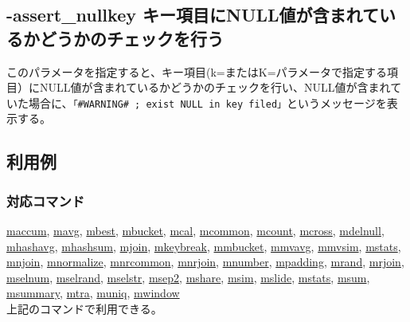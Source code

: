 

%

\subsection{-assert\_nullkey キー項目にNULL値が含まれているかどうかのチェックを行う \label{sect:option_assert_nullkey}}

このパラメータを指定すると、キー項目(k=またはK=パラメータで指定する項目）にNULL値が含まれているかどうかのチェックを行い、NULL値が含まれていた場合に、\verb|「#WARNING# ; exist NULL in key filed」|というメッセージを表示する。

\subsection*{利用例}


\subsubsection*{対応コマンド}
\hyperref[sect:maccum]{maccum},
\hyperref[sect:mavg]{mavg},
\hyperref[sect:mbest]{mbest},
\hyperref[sect:mbucket]{mbucket},
\hyperref[sect:mcal]{mcal},
\hyperref[sect:mcommon]{mcommon},
\hyperref[sect:mcount]{mcount},
\hyperref[sect:mcross]{mcross},
\hyperref[sect:mdelnull]{mdelnull},
\hyperref[sect:mhashavg]{mhashavg},
\hyperref[sect:mhashsum]{mhashsum},
\hyperref[sect:mjoin]{mjoin},
\hyperref[sect:mkeybreak]{mkeybreak},
\hyperref[sect:mmbucket]{mmbucket},
\hyperref[sect:mmvavg]{mmvavg},
\hyperref[sect:mmvsim]{mmvsim},
\hyperref[sect:mstats]{mstats},
\hyperref[sect:mnjoin]{mnjoin},
\hyperref[sect:mnormalize]{mnormalize},
\hyperref[sect:mnrcommon]{mnrcommon},
\hyperref[sect:mnrjoin]{mnrjoin},
\hyperref[sect:mnumber]{mnumber},
\hyperref[sect:mpadding]{mpadding},
\hyperref[sect:mrand]{mrand},
\hyperref[sect:mrjoin]{mrjoin},
\hyperref[sect:mselnum]{mselnum},
\hyperref[sect:mselrand]{mselrand},
\hyperref[sect:mselstr]{mselstr},
\hyperref[sect:msep2]{msep2},
\hyperref[sect:mshare]{mshare},
\hyperref[sect:msim]{msim},
\hyperref[sect:mslide]{mslide},
\hyperref[sect:mstats]{mstats},
\hyperref[sect:msum]{msum},
\hyperref[sect:msummary]{msummary},
\hyperref[sect:mtra]{mtra},
\hyperref[sect:muniq]{muniq},
\hyperref[sect:mwindow]{mwindow}\\
上記のコマンドで利用できる。

%

